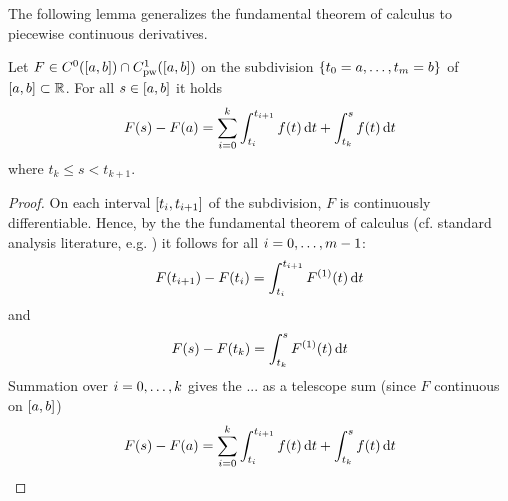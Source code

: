     The following lemma generalizes the fundamental theorem of calculus to piecewise continuous derivatives.
    \begin{lemma}[]\label{lm:pc-hauptsatz}
        Let $F\in\Cn[0]{\compactum{a}{b}}{}\cap\Cnpw[1]{\compactum{a}{b}}{}$ on the subdivision $\set{\range{t_0=a}{t_m=b}}$ of $\compactum{a}{b}\subset\R$.
        For all $s\in\compactum{a}{b}$ it holds
        \begin{equation*}
            F(s)-F(a) = \sum_{i=0}^k\int_{t_i}^{t_{i+1}}f(t)\dx[t] + \int_{t_k}^s f(t)\dx[t]
        \end{equation*}
        where $t_k\leq s < t_{k+1}$.
    \end{lemma}
    \begin{proof}
        On each interval $\compactum{t_i}{t_{i+1}}$ of the subdivision, $F$ is continuously differentiable. Hence, by the the fundamental theorem of calculus (cf. standard analysis literature, e.g. \cite{Gathmann12GDM,Rudin76PrinciplesAnalysis}) it follows for all $i=\range{0}{m-1}$:
        \begin{equation*}
            F(t_{i+1})-F(t_i) = \int_{t_i}^{t_{i+1}}\D{F}(t)\dx[t]
        \end{equation*}
        and
        \begin{equation*}
            F(s)-F(t_k) = \int_{t_k}^{s}\D{F}(t)\dx[t]
        \end{equation*}
        Summation over $i=\range{0}{k}$ gives the ... as a telescope sum (since $F$ continuous on $\compactum{a}{b}$)
        \begin{equation*}
            F(s)-F(a) = \sum_{i=0}^k\int_{t_i}^{t_{i+1}}f(t)\dx[t] + \int_{t_k}^s f(t)\dx[t]
        \end{equation*}
    \end{proof}




